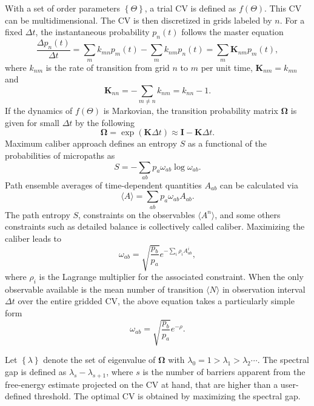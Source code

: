 With a set of order parameters $\left\{\Theta\right\}$, a trial CV is defined as $f(\Theta)$. This CV can be multidimensional. The CV is then discretized in grids labeled by $n$. For a fixed $\Delta t$, the instantaneous probability $p_n(t)$ follows the master equation
\begin{equation}
	\frac{\Delta p_n(t)}{\Delta t}=\sum_m k_{mn} p_m(t)-\sum_m k_{nm} p_n(t)=\sum_m \mathbf{K}_{nm}p_m(t),
\end{equation} 
where $k_{nm}$ is the rate of transition from grid $n$ to $m$ per unit time, $\mathbf{K}_{nm}=k_{mn}$ and
\begin{equation}
	\mathbf{K}_{nn}=-\sum_{m\neq n}k_{nm}=k_{nn}-1.
\end{equation}
If the dynamics of $f(\Theta)$ is Markovian, the transition probability matrix $\boldsymbol{\Omega}$ is given for small $\Delta t$ by the following
\begin{equation}
	\boldsymbol{\Omega}=\exp{(\mathbf{K}\Delta t)}\approx \mathbf{I}-\mathbf{K}\Delta t.
\end{equation}
Maximum caliber approach defines an entropy $S$ as a functional of the probabilities of micropaths as
\begin{equation}
	S=-\sum_{ab}p_a\omega_{ab}\log\omega_{ab}.
\end{equation}
Path ensemble averages of time-dependent quantities $A_{ab}$ can be calculated via
\begin{equation}
	\langle A\rangle =\sum_{ab} p_a\omega_{ab}A_{ab}.
\end{equation}
The path entropy $S$, constraints on the observables $\langle A^n\rangle$, and some others constraints such as detailed balance is collectively called caliber. Maximizing the caliber leads to
\begin{equation}
	\omega_{ab}=\sqrt{\frac{p_b}{p_a}}e^{-\sum_i\rho_iA_{ab}^i},
\end{equation}
where $\rho_i$ is the Lagrange multiplier for the associated constraint. When the only observable available is the mean number of transition $\langle N \rangle$ in observation interval $\Delta t$ over the entire gridded CV, the above equation takes a particularly simple form
\begin{equation}
	\omega_{ab}=\sqrt{\frac{p_b}{p_a}}e^{-\rho}.
\end{equation}

Let $\left\{\lambda\right\}$ denote the set of eigenvalue of $\boldsymbol{\Omega}$ with $\lambda_0=1>\lambda_1>\lambda_2\cdots$. The spectral gap is defined as $\lambda_s-\lambda_{s+1}$, where $s$ is the number of barriers apparent from the free-energy estimate projected on the CV at hand, that are higher than a user-defined threshold. The optimal CV is obtained by maximizing the spectral gap.
